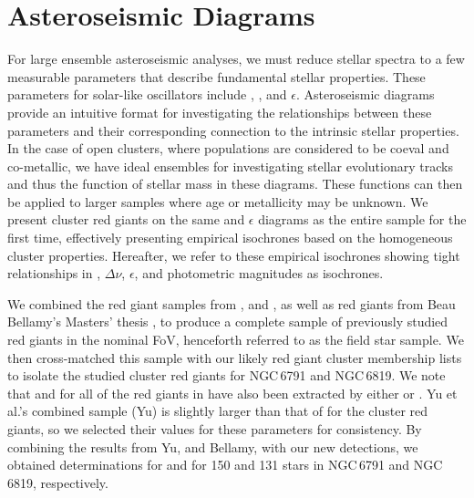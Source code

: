 \section{Asteroseismic Diagrams}

For large ensemble asteroseismic analyses, we must reduce stellar spectra to a few measurable parameters that describe fundamental stellar properties. These parameters for solar-like oscillators include \numax{}, \dnu{}, and $\epsilon$. Asteroseismic diagrams provide an intuitive format for investigating the relationships between these parameters and their corresponding connection to the intrinsic stellar properties. In the case of open clusters, where populations are considered to be coeval and co-metallic, we have ideal ensembles for investigating stellar evolutionary tracks and thus the function of stellar mass in these diagrams. These functions can then be applied to larger samples where age or metallicity may be unknown. We present cluster red giants on the same \numax{} \textendash{} \dnu{} and \dnu{} \textendash{} $\epsilon$ diagrams as the entire \Kepler{} sample for the first time, effectively presenting empirical isochrones based on the homogeneous cluster properties. Hereafter, we refer to these empirical isochrones showing tight relationships in \numax{}, $\Delta\nu$, $\epsilon$, and photometric magnitudes as isochrones.

We combined the red giant samples from \cite{hon_deep_2018}, \cite{yu_asteroseismology_2018-1} and \cite{yu_asteroseismology_2020}, as well as red giants from Beau Bellamy's Masters' thesis \citep{bellamy_using_2015}, to produce a complete sample of previously studied red giants in the nominal \Kepler{} FoV, henceforth referred to as the field star sample. We then cross-matched this sample with our likely red giant cluster membership lists to isolate the studied cluster red giants for NGC\,6791 and NGC\,6819. We note that \numax{} and \dnu{} for all of the red giants in \cite{hon_deep_2018} have also been extracted by either \cite{yu_asteroseismology_2018-1} or \cite{yu_asteroseismology_2020}. Yu et al.'s combined sample (Yu) is slightly larger than that of \cite{hon_deep_2018} for the cluster red giants, so we selected their values for these parameters for consistency. By combining the results from Yu, and Bellamy, with our new detections, we obtained determinations for \numax{} and \dnu{} for 150 and 131 stars in NGC\,6791 and NGC\,6819, respectively.

